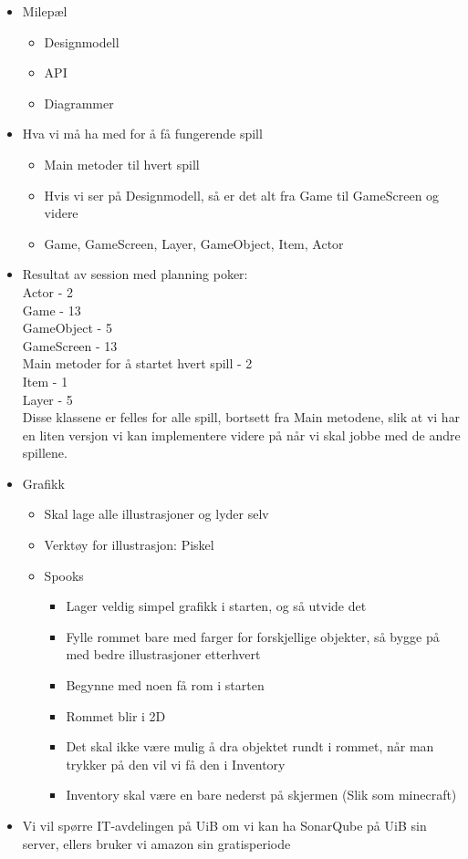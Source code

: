\documentclass[11pt]{meetingmins}
\begin{document}
\begin{itemize}
\item Milep{\ae}l

\begin{itemize}
\item Designmodell
\item API
\item Diagrammer
\end{itemize}
\item Hva vi m{\aa} ha med for {\aa} f{\aa} fungerende spill

\begin{itemize}
\item Main metoder til hvert spill
\item Hvis vi ser p{\aa} Designmodell, s{\aa} er det alt fra Game til GameScreen og videre
\item Game, GameScreen, Layer, GameObject, Item, Actor
\end{itemize}
\item Resultat av session med planning poker: \\
 Actor - 2 \\
 Game - 13 \\
 GameObject - 5 \\
 GameScreen - 13 \\
 Main metoder for {\aa} startet hvert spill - 2 \\
 Item - 1 \\
 Layer - 5 \\
\newline
Disse klassene er felles for alle spill, bortsett fra Main metodene, slik at vi har en liten versjon vi kan implementere videre p{\aa} n{\aa}r vi skal jobbe med de andre spillene.

\item Grafikk

\begin{itemize}
\item Skal lage alle illustrasjoner og lyder selv
\item Verkt{\o}y for illustrasjon: Piskel
\item Spooks

\begin{itemize}
\item Lager veldig simpel grafikk i starten, og s{\aa} utvide det
\item Fylle rommet bare med farger for forskjellige objekter, s{\aa} bygge p{\aa} med bedre illustrasjoner etterhvert
\item Begynne med noen f{\aa} rom i starten
\item Rommet blir i 2D
\item Det skal ikke v{\ae}re mulig {\aa} dra objektet rundt i rommet, n{\aa}r man trykker p{\aa} den vil vi f{\aa} den i
Inventory
\item Inventory skal v{\ae}re en bare nederst p{\aa} skjermen (Slik som minecraft)
\end{itemize}
\end{itemize}
\item Vi vil sp{\o}rre IT-avdelingen p{\aa} UiB om vi kan ha SonarQube p{\aa} UiB sin server, ellers bruker vi amazon
sin gratisperiode
\end{itemize}
\end{document}
